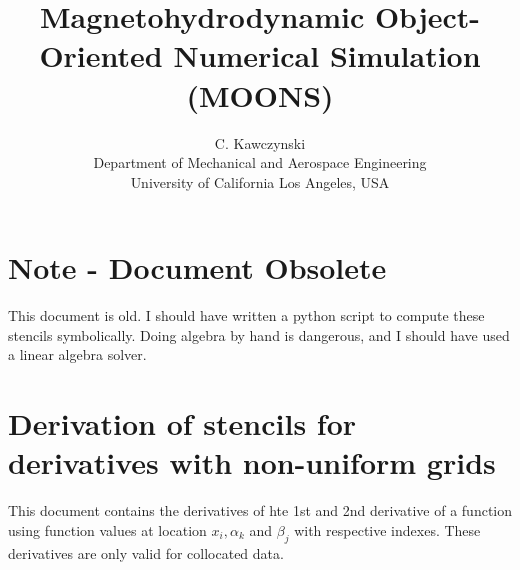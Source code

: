 \documentclass[11pt]{article}
\begin{document}
\doublespacing
\title{Magnetohydrodynamic Object-Oriented Numerical Simulation (MOONS)}
\author{C. Kawczynski \\
Department of Mechanical and Aerospace Engineering \\
University of California Los Angeles, USA\\
}
\maketitle

\section{Note - Document Obsolete}

This document is old. I should have written a python script to compute these stencils symbolically. Doing algebra by hand is dangerous, and I should have used a linear algebra solver.

\section{Derivation of stencils for derivatives with non-uniform grids}

This document contains the derivatives of hte 1st and 2nd derivative of a function using function values at location $x_i, \alpha_k$ and $\beta_j$ with respective indexes. These derivatives are only valid for collocated data.
\end{document}
